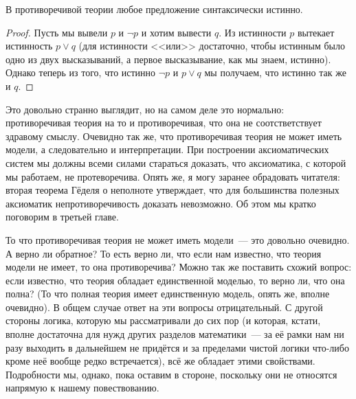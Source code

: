 \begin{thm}
В противоречивой теории любое предложение синтаксически истинно.
\end{thm}
\begin{proof}
Пусть мы вывели $p$ и $\neg p$ и хотим вывести $q$. Из истинности $p$ вытекает истинность $p\lor q$ (для истинности <<или>> достаточно, чтобы истинным было одно из двух высказываний, а первое высказывание, как мы знаем, истинно). Однако теперь из того, что истинно $\neg p$ и $p\lor q$ мы получаем, что истинно так же и $q$.
\end{proof}

Это довольно странно выглядит, но на самом деле это нормально: противоречивая теория на то и противоречивая, что она не соотстветствует здравому смыслу. Очевидно так же, что противоречивая теория не может иметь модели, а следовательно и интерпретации. При построении аксиоматических систем мы должны всеми силами стараться доказать, что аксиоматика, с которой мы работаем, не протеворечива. Опять же, я могу заранее обрадовать читателя: вторая теорема Гёделя о неполноте утверждает, что для большинства полезных аксиоматик непротиворечивость доказать невозможно. Об этом мы кратко поговорим в третьей главе.

То что противоречивая теория не может иметь модели~--- это довольно очевидно. А верно ли обратное? То есть верно ли, что если нам известно, что теория модели не имеет, то она противоречива? Можно так же поставить схожий вопрос: если известно, что теория обладает единственной моделью, то верно ли, что она полна? (То что полная теория имеет единственную модель, опять же, вполне очевидно). В общем случае ответ на эти вопросы отрицательный. С другой стороны логика, которую мы рассматривали до сих пор (и которая, кстати, вполне достаточна для нужд других разделов математики~--- за её рамки нам ни разу выходить в дальнейшем не придётся и за пределами чистой логики что-либо кроме неё вообще редко встречается), всё же обладает этими свойствами. Подробности мы, однако, пока оставим в стороне, поскольку они не относятся напрямую к нашему повествованию.
